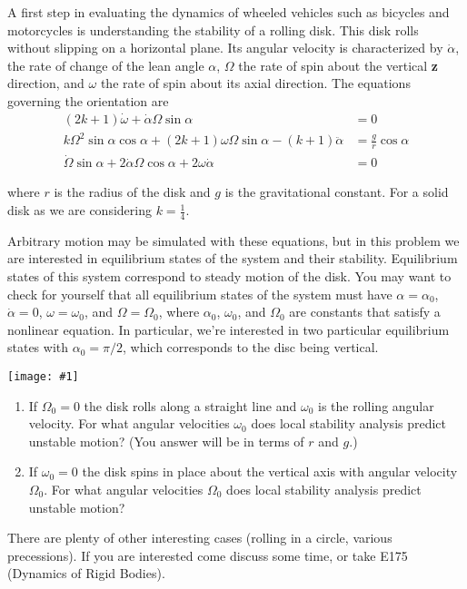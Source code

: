 \documentclass[12pt,letterpaper]{hmcpset}
\newcommand{\diagram}[2]{\begin{center}\texttt{[image: \#1]}\end{center}}
\begin{document}
	\newpage
	
	\begin{problem}[2]
		A first step in evaluating the dynamics of wheeled vehicles such as bicycles and motorcycles is
		understanding the stability of a rolling disk. This disk rolls without slipping on a horizontal
		plane. Its angular velocity is characterized by $\dot{\alpha}$, the rate of change of the lean angle $\alpha$, $\Omega$ the
		rate of spin about the vertical \textbf{z} direction, and $\omega$ the rate of spin about its axial direction.
		The equations governing the orientation are
		\begin{displaymath}
			\begin{split}
				(2k+1)\dot{\omega} + \dot{\alpha}\Omega \sin\alpha &= 0\\
				k\Omega^2 \sin\alpha \cos\alpha + (2k+1)\omega\Omega \sin\alpha - (k+1)\ddot{\alpha} &= \frac{g}{r} \cos\alpha\\
				\dot{\Omega} \sin\alpha + 2\dot{\alpha} \Omega\cos\alpha + 2\omega\dot{\alpha} &= 0
			\end{split}
		\end{displaymath}
		
		where $r$ is the radius of the disk and $g$ is the gravitational constant. For a solid disk as we are
		considering $k = \frac{1}{4}$.
		
		Arbitrary motion may be simulated with these equations, but in this problem we are interested
		in equilibrium states of the system and their stability. Equilibrium states of this system
		correspond to steady motion of the disk. You may want to check for yourself that all
		equilibrium states of the system must have $\alpha = \alpha_0$, $\dot\alpha = 0$, $\omega = \omega_0$, and $\Omega = \Omega_0$, where $\alpha_0$, $\omega_0$, and $\Omega_0 $ are constants that satisfy a nonlinear equation. In particular, we're interested in two
		particular equilibrium states with $\alpha_0 = \pi/2$, which corresponds to the disc being vertical.
		
		\diagram{Disk}{3}
		
		\begin{enumerate}
			\item If $\Omega_0 = 0$ the disk rolls along a straight line and $\omega_0$ is the rolling angular velocity. For
			what angular velocities $\omega_0$ does local stability analysis predict unstable motion? (You
			answer will be in terms of $r$ and $g$.)
			
			\item If $ \omega_0 = 0 $ the disk spins in place about the vertical axis with angular velocity $\Omega_0$. For
			what angular velocities $\Omega_0$ does local stability analysis predict unstable motion?
		\end{enumerate}
		There are plenty of other interesting cases (rolling in a circle, various precessions). If you
		are interested come discuss some time, or take E175 (Dynamics of Rigid Bodies).
	\end{problem}
	
\end{document}
